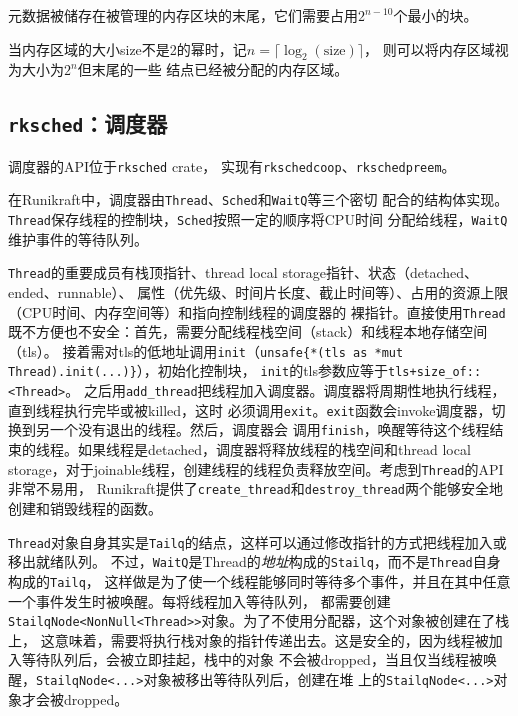 \documentclass{../runikraft-report}
\begin{document}
元数据被储存在被管理的内存区块的末尾，它们需要占用$2^{n-10}$个最小的块。

当内存区域的大小size不是2的幂时，记$n=\lceil\log_2(\mathrm{size})\rceil$，
则可以将内存区域视为大小为$2^n$但末尾的一些
结点已经被分配的内存区域。

\subsection[\texttt{rksched}]{\texttt{rksched}：调度器}
调度器的API位于\texttt{rksched} crate，
实现有\texttt{rkschedcoop}、\texttt{rkschedpreem}。

在Runikraft中，调度器由\texttt{Thread}、\texttt{Sched}和\texttt{WaitQ}等三个密切
配合的结构体实现。\texttt{Thread}保存线程的控制块，\texttt{Sched}按照一定的顺序将CPU时间
分配给线程，\texttt{WaitQ}维护事件的等待队列。

\texttt{Thread}的重要成员有栈顶指针、thread local storage指针、状态（detached、ended、runnable）、
属性（优先级、时间片长度、截止时间等）、占用的资源上限（CPU时间、内存空间等）和指向控制线程的调度器的
裸指针。直接使用\texttt{Thread}既不方便也不安全：首先，需要分配线程栈空间（stack）和线程本地存储空间（tls）。
接着需对tls的低地址调用\texttt{init}（\texttt{unsafe\{*(tls as *mut Thread).init(...)\}}），初始化控制块，
\texttt{init}的tls参数应等于\texttt{tls+size\_of::<Thread>}。
之后用\texttt{add\_thread}把线程加入调度器。调度器将周期性地执行线程，直到线程执行完毕或被killed，这时
必须调用\texttt{exit}。\texttt{exit}函数会invoke调度器，切换到另一个没有退出的线程。然后，调度器会
调用\texttt{finish}，唤醒等待这个线程结束的线程。如果线程是detached，调度器将释放线程的栈空间和thread local
storage，对于joinable线程，创建线程的线程负责释放空间。考虑到\texttt{Thread}的API非常不易用，
Runikraft提供了\texttt{create\_thread}和\texttt{destroy\_thread}两个能够安全地创建和销毁线程的函数。

\texttt{Thread}对象自身其实是\texttt{Tailq}的结点，这样可以通过修改指针的方式把线程加入或移出就绪队列。
不过，\texttt{WaitQ}是Thread的\textit{地址}构成的\texttt{Stailq}，而不是\texttt{Thread}自身
构成的\texttt{Tailq}，
这样做是为了使一个线程能够同时等待多个事件，并且在其中任意一个事件发生时被唤醒。每将线程加入等待队列，
都需要创建\texttt{StailqNode<NonNull<Thread>>}对象。为了不使用分配器，这个对象被创建在了栈上，
这意味着，需要将执行栈对象的指针传递出去。这是安全的，因为线程被加入等待队列后，会被立即挂起，栈中的对象
不会被dropped，当且仅当线程被唤醒，\texttt{StailqNode<...>}对象被移出等待队列后，创建在堆
上的\texttt{StailqNode<...>}对象才会被dropped。
\end{document}
